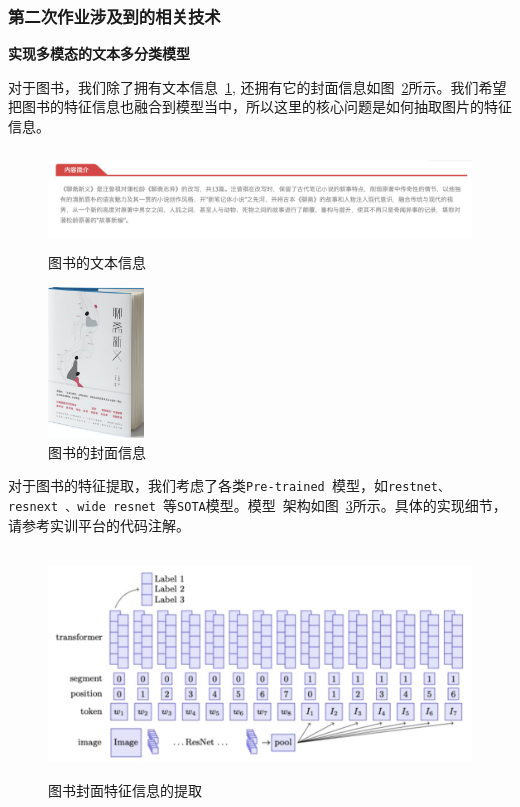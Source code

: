 \subsubsection{第二次作业涉及到的相关技术}


\noindent \textbf{实现多模态的文本多分类模型}

\noindent 对于图书，我们除了拥有文本信息~\ref{fig:book_task2_text}, 还拥有它的封面信息如图~\ref{fig:book_task2_cover}所示。我们希望把图书的特征信息也融合到模型当中，所以这里的核心问题是如何抽取图片的特征信息。 

\begin{figure}[ht]
 \centering
 \includegraphics[height=2.6cm]{images/book_task2_text.jpg}
 \caption{图书的文本信息}
 \label{fig:book_task2_text}
\end{figure}

\begin{figure}[ht]
 \centering
 \includegraphics[height=4cm]{images/book_task2_cover.jpg}
 \caption{图书的封面信息}
 \label{fig:book_task2_cover}
\end{figure}
 
\noindent 对于图书的特征提取，我们考虑了各类\texttt{Pre-trained }模型，如\texttt{restnet、resnext~\cite{DBLP:journals/corr/XieGDTH16}、wide resnet~\cite{zagoruyko2016wide}}等\texttt{SOTA}模型。模型~\cite{kiela2019supervised}架构如图~\ref{fig:book_task2_transformer}所示。具体的实现细节，请参考实训平台的代码注解。\\

\begin{figure}[ht]
 \centering
 \includegraphics[height=6cm]{images/book_task2_transformer.jpg}
 \caption{图书封面特征信息的提取~\cite{tsai2019MULT}\\}
 \label{fig:book_task2_transformer}
\end{figure}\\

